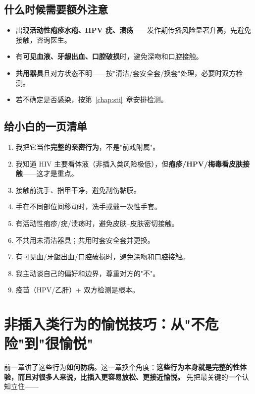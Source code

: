 \documentclass[12pt,UTF8,openany]{ctexbook}
\begin{document}
\section{什么时候需要额外注意}

\begin{itemize}[leftmargin=2em]
  \item 出现\textbf{活动性疱疹水疱、HPV 疣、溃疡}——发作期传播风险显著升高，先避免接触，咨询医生。
  \item 有\textbf{可见血液、牙龈出血、口腔破损}时，避免深吻和口腔接触。
  \item \textbf{共用器具}且对方状态不明——按"清洁/套安全套/换套"处理，必要时双方检测。
  \item 若不确定是否感染，按第~\ref{chap:sti}~章安排检测。
\end{itemize}

\section{给小白的一页清单}

\begin{enumerate}[leftmargin=2em,itemsep=0.3em]
  \item 我把它当作\textbf{完整的亲密行为}，不是"前戏附属"。
  \item 我知道 HIV 主要看体液（非插入类风险极低），但\textbf{疱疹/HPV/梅毒看皮肤接触}——这才是重点。
  \item 接触前洗手、指甲干净，避免刮伤黏膜。
  \item 手在不同部位间移动时，洗手或戴一次性手套。
  \item 有活动性疱疹/疣/溃疡时，避免皮肤--皮肤密切接触。
  \item 不共用未清洁器具；共用时套安全套并更换。
  \item 有可见血/牙龈出血/口腔破损时，避免深吻和口腔接触。
  \item 我主动谈自己的偏好和边界，尊重对方的"不"。
  \item 疫苗（HPV/乙肝）+ 双方检测是根本。
\end{enumerate}

\chapter{非插入类行为的愉悦技巧：从"不危险"到"很愉悦"}
\label{chap:outer-pleasure}

前一章讲了这些行为\textbf{如何防病}。这一章换个角度：\textbf{这些行为本身就是完整的性体验，而且对很多人来说，比插入更容易放松、更接近愉悦。} 先把最关键的一个认知立住——
\end{document}
